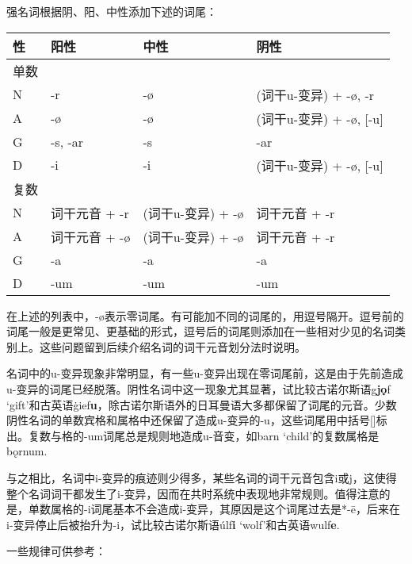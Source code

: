 强名词根据阴、阳、中性添加下述的词尾：

\begin{longtable}{llll}
  \toprule
  \textbf{性} & \textbf{阳性} & \textbf{中性}   & \textbf{阴性}             \\
  \midrule
  \endhead
  \bottomrule
  \endfoot
  单数         &             &               &                         \\
  N          & -r          & -ø            & (词干u-变异) + -ø, -r       \\
  A          & -ø          & -ø            & (词干u-变异) + -ø, {[}-u{]} \\
  G          & -s, -ar     & -s            & -ar                     \\
  D          & -i          & -i            & (词干u-变异) + -ø, {[}-u{]} \\
  复数         &             &               &                         \\
  N          & 词干元音 + -r   & (词干u-变异) + -ø & 词干元音 + -r               \\
  A          & 词干元音 + -ø   & (词干u-变异) + -ø & 词干元音 + -r               \\
  G          & -a          & -a            & -a                      \\
  D          & -um         & -um           & -um                     \\
\end{longtable}

在上述的列表中，-ø表示零词尾。有可能加不同的词尾的，用逗号隔开。逗号前的词尾一般是更常见、更基础的形式，逗号后的词尾则添加在一些相对少见的名词类别上。这些问题留到后续介绍名词的词干元音划分法时说明。

名词中的u-变异现象非常明显，有一些u-变异出现在零词尾前，这是由于先前造成u-变异的词尾已经脱落。阴性名词中这一现象尤其显著，试比较古诺尔斯语g\textbf{jǫ}f
`gift'和古英语ġief\textbf{u}，除古诺尔斯语外的日耳曼语大多都保留了词尾的元音。少数阴性名词的单数宾格和属格中还保留了造成u-变异的-u，这些词尾用中括号{[}{]}标出。复数与格的-um词尾总是规则地造成u-音变，如barn
`child'的复数属格是bǫrnum.

与之相比，名词中i-变异的痕迹则少得多，某些名词的词干元音包含i或j，这使得整个名词词干都发生了i-变异，因而在共时系统中表现地非常规则。值得注意的是，单数属格的-i词尾基本不会造成i-变异，其原因是这个词尾过去是*-ē，后来在i-变异停止后被抬升为-i，试比较古诺尔斯语úlf\textbf{i}
`wolf'和古英语wulf\textbf{e}.

一些规律可供参考：

